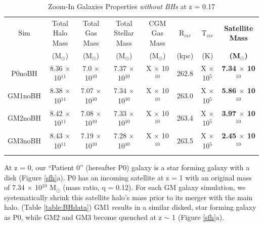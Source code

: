 \documentclass[]{emulateapj}
\begin{document}
\begin{table}[ht!]
\end{table}\begin{table}[ht] %
\caption{Zoom-In Galaxies Properties \textit{without BHs} at  z = 0.17} %
\centering %
\begin{tabular}{c c c c c c c c} %
\hline\hline %
Sim & Total Halo Mass  & Total Gas Mass & Total Stellar Mass & CGM Gas Mass & R$_{vir}$ & T$_{vir}$ & \textbf{Satellite Mass}\\
 & (M$_{\odot}$) & (M$_{\odot}$) & (M$_{\odot}$) & (M$_{\odot}$) & (kpc) & (K) & \textbf{(M$_{\odot}$)} \\ [0.5ex] %
\hline %
P0noBH & 8.36 $\times$ 10$^{11}$ & 7.0 $\times$ 10$^{10}$ & 7.37 $\times$ 10$^{10}$ & X $\times$ 10$^{10}$ & 262.8 & X $\times$ 10$^5$ & \textbf{7.34 $\times$ 10$^{10}$}\\ %
GM1noBH & 8.38 $\times$ 10$^{11}$ & 7.07 $\times$ 10$^{10}$ & 7.34 $\times$ 10$^{10}$ & X $\times$ 10$^{10}$ & 263.0 & X $\times$ 10$^5$ & \textbf{5.86 $\times$ 10$^{10}$}\\
GM2noBH & 8.42 $\times$ 10$^{11}$ & 7.08 $\times$ 10$^{10}$ & 7.33 $\times$ 10$^{10}$ & X $\times$ 10$^{10}$ & 263.4 & X $\times$ 10$^5$ & \textbf{3.97 $\times$ 10$^{10}$}  \\ %
GM3noBH & 8.43 $\times$ 10$^{11}$ & 7.19 $\times$ 10$^{10}$ & 7.28 $\times$ 10$^{10}$ & X $\times$ 10$^{10}$ & 263.5 & X $\times$ 10$^5$ & \textbf{2.45 $\times$ 10$^{10}$} \\ [1ex] %
\hline %
\vspace{5.111mm}
\end{tabular}
\label{table:noBHdata} %
\end{table}



At z = 0, our ``Patient 0'' (hereafter P0) galaxy is a star forming galaxy with a disk (Figure \ref{sfh}a). P0 has an incoming satellite at z = 1 with an original mass of 7.34 $\times$ 10$^{10}$ M$_{\odot}$ (mass ratio, q = 0.12). For each GM galaxy simulation, we systematically shrink this satellite halo's mass prior to its merger with the main halo. (Table \ref{table:BHdata}) GM1 results in a similar disked, star forming galaxy as P0, while GM2 and GM3 become quenched at z $\sim$ 1 (Figure \ref{sfh}a). 
\end{document}
